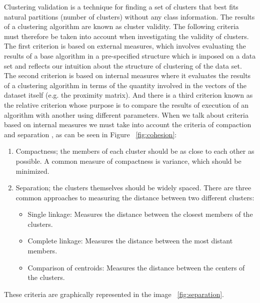 Clustering validation is a technique for finding a set of clusters that best fits natural partitions (number of clusters) without any class information. The results of a clustering algorithm are known as cluster validity. The following criteria must therefore be taken into account when investigating the validity of clusters. The first criterion is based on external measures, which involves evaluating the results of a base algorithm in a pre-specified structure which is imposed on a data set and reflects our intuition about the structure of clustering of the data set. The second criterion is based on internal measures where it evaluates the results of a clustering algorithm in terms of the quantity involved in the vectors of the dataset itself (e.g. the proximity matrix). And there is a third criterion known as the relative criterion whose purpose is to compare the results of execution of an algorithm with another using different parameters.
When we talk about criteria based on internal measures we must take into account the criteria of compaction and separation \citep{b53} \citep{b52}, as can be seen in Figure ~\ref{fig:cohesion}:
\begin{enumerate}
  \item Compactness; the members of each cluster should be as close to each other as possible. A common measure of compactness is variance, which should be minimized.
  \item Separation; the clusters themselves should be widely spaced. There are three common approaches to measuring the distance between two different clusters:
  \begin{itemize}
  \item Single linkage: Measures the distance between the closest members of the clusters.
  \item Complete linkage: Measures the distance between the most distant members.
  \item Comparison of centroids: Measures the distance between the centers of the clusters.
\end{itemize}
\end{enumerate}
These criteria are graphically represented in the image ~\ref{fig:separation}.

